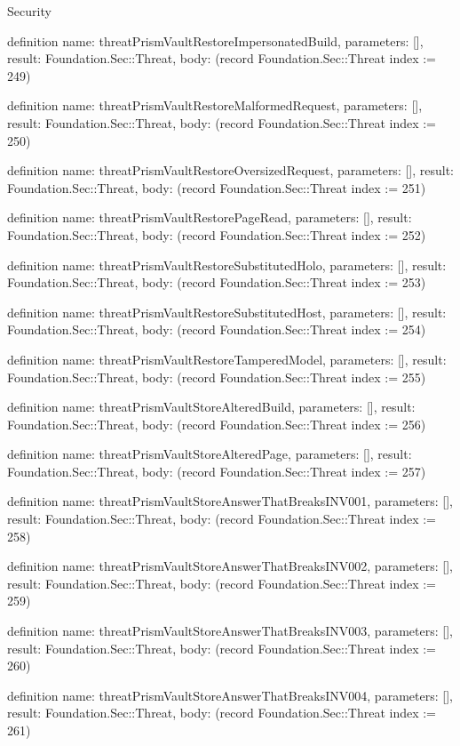 \begin{lexlean}{Security}
\begin{semanticmodule}
definition{
  name: threatPrismVaultRestoreImpersonatedBuild,
  parameters: [],
  result: Foundation.Sec::Threat,
  body: (record Foundation.Sec::Threat {index := 249})
}

definition{
  name: threatPrismVaultRestoreMalformedRequest,
  parameters: [],
  result: Foundation.Sec::Threat,
  body: (record Foundation.Sec::Threat {index := 250})
}

definition{
  name: threatPrismVaultRestoreOversizedRequest,
  parameters: [],
  result: Foundation.Sec::Threat,
  body: (record Foundation.Sec::Threat {index := 251})
}

definition{
  name: threatPrismVaultRestorePageRead,
  parameters: [],
  result: Foundation.Sec::Threat,
  body: (record Foundation.Sec::Threat {index := 252})
}

definition{
  name: threatPrismVaultRestoreSubstitutedHolo,
  parameters: [],
  result: Foundation.Sec::Threat,
  body: (record Foundation.Sec::Threat {index := 253})
}

definition{
  name: threatPrismVaultRestoreSubstitutedHost,
  parameters: [],
  result: Foundation.Sec::Threat,
  body: (record Foundation.Sec::Threat {index := 254})
}

definition{
  name: threatPrismVaultRestoreTamperedModel,
  parameters: [],
  result: Foundation.Sec::Threat,
  body: (record Foundation.Sec::Threat {index := 255})
}

definition{
  name: threatPrismVaultStoreAlteredBuild,
  parameters: [],
  result: Foundation.Sec::Threat,
  body: (record Foundation.Sec::Threat {index := 256})
}

definition{
  name: threatPrismVaultStoreAlteredPage,
  parameters: [],
  result: Foundation.Sec::Threat,
  body: (record Foundation.Sec::Threat {index := 257})
}

definition{
  name: threatPrismVaultStoreAnswerThatBreaksINV001,
  parameters: [],
  result: Foundation.Sec::Threat,
  body: (record Foundation.Sec::Threat {index := 258})
}

definition{
  name: threatPrismVaultStoreAnswerThatBreaksINV002,
  parameters: [],
  result: Foundation.Sec::Threat,
  body: (record Foundation.Sec::Threat {index := 259})
}

definition{
  name: threatPrismVaultStoreAnswerThatBreaksINV003,
  parameters: [],
  result: Foundation.Sec::Threat,
  body: (record Foundation.Sec::Threat {index := 260})
}

definition{
  name: threatPrismVaultStoreAnswerThatBreaksINV004,
  parameters: [],
  result: Foundation.Sec::Threat,
  body: (record Foundation.Sec::Threat {index := 261})
}


\end{semanticmodule}
\end{lexlean}
